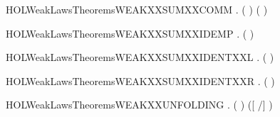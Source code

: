 \newcommand{\HOLWeakLawsTheoremsWEAKXXSUMXXASSOCXXR}{\UseVerbatim{HOLWeakLawsTheoremsWEAKXXSUMXXASSOCXXR}}
\begin{SaveVerbatim}{HOLWeakLawsTheoremsWEAKXXSUMXXCOMM}
\HOLTokenTurnstile{} \HOLSymConst{\HOLTokenForall{}} .  ( \HOLSymConst{\ensuremath{+}} ) ( \HOLSymConst{\ensuremath{+}} )
\end{SaveVerbatim}
\newcommand{\HOLWeakLawsTheoremsWEAKXXSUMXXCOMM}{\UseVerbatim{HOLWeakLawsTheoremsWEAKXXSUMXXCOMM}}
\begin{SaveVerbatim}{HOLWeakLawsTheoremsWEAKXXSUMXXIDEMP}
\HOLTokenTurnstile{} \HOLSymConst{\HOLTokenForall{}}.  ( \HOLSymConst{\ensuremath{+}} ) 
\end{SaveVerbatim}
\newcommand{\HOLWeakLawsTheoremsWEAKXXSUMXXIDEMP}{\UseVerbatim{HOLWeakLawsTheoremsWEAKXXSUMXXIDEMP}}
\begin{SaveVerbatim}{HOLWeakLawsTheoremsWEAKXXSUMXXIDENTXXL}
\HOLTokenTurnstile{} \HOLSymConst{\HOLTokenForall{}}.  ( \HOLSymConst{\ensuremath{+}} ) 
\end{SaveVerbatim}
\newcommand{\HOLWeakLawsTheoremsWEAKXXSUMXXIDENTXXL}{\UseVerbatim{HOLWeakLawsTheoremsWEAKXXSUMXXIDENTXXL}}
\begin{SaveVerbatim}{HOLWeakLawsTheoremsWEAKXXSUMXXIDENTXXR}
\HOLTokenTurnstile{} \HOLSymConst{\HOLTokenForall{}}.  ( \HOLSymConst{\ensuremath{+}} ) 
\end{SaveVerbatim}
\newcommand{\HOLWeakLawsTheoremsWEAKXXSUMXXIDENTXXR}{\UseVerbatim{HOLWeakLawsTheoremsWEAKXXSUMXXIDENTXXR}}
\begin{SaveVerbatim}{HOLWeakLawsTheoremsWEAKXXUNFOLDING}
\HOLTokenTurnstile{} \HOLSymConst{\HOLTokenForall{}} .  (  ) ([  /] )
\end{SaveVerbatim}
\newcommand{\HOLWeakLawsTheoremsWEAKXXUNFOLDING}{\UseVerbatim{HOLWeakLawsTheoremsWEAKXXUNFOLDING}}
